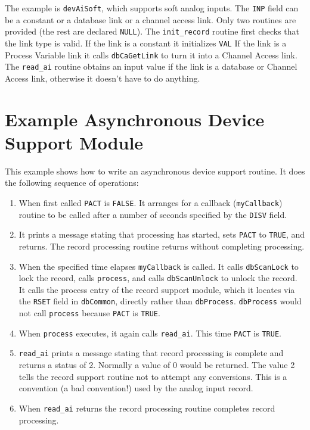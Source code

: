 The example is \verb|devAiSoft|, which supports soft analog inputs. The \verb|INP| field can be a constant or a database link or a 
channel access link. Only two routines are provided (the rest are declared \verb|NULL|). The \verb|init_record| routine first checks 
that the link type is valid. If the link is a constant it initializes \verb|VAL| If the link is a Process Variable link it calls 
\verb|dbCaGetLink| to turn it into a Channel Access link. The \verb|read_ai| routine obtains an input value if the link is a database 
or Channel Access link, otherwise it doesn't have to do anything.  

\section{Example Asynchronous Device Support Module}

This example shows how to write an asynchronous device support routine. It does the following sequence of operations:

\begin{enumerate}
\item When first called \verb|PACT| is \verb|FALSE|. It arranges for a callback (\verb|myCallback|) routine to be called after a number of 
seconds specified by the \verb|DISV| field.

\item It prints a message stating that processing has started, sets \verb|PACT| to \verb|TRUE|, and returns. The record processing routine 
returns without completing processing.

\item When the specified time elapses \verb|myCallback| is called. It calls \verb|dbScanLock| to lock the record, calls \verb|process|, 
and calls \verb|dbScanUnlock| to unlock the record. It calls the process entry of the record support module, which it 
locates via the \verb|RSET| field in \verb|dbCommon|, directly rather than \verb|dbProcess|. \verb|dbProcess| would not call \verb|process| 
because \verb|PACT| is \verb|TRUE|. 

\item When \verb|process| executes, it again calls \verb|read_ai|. This time \verb|PACT| is \verb|TRUE|.

\item \verb|read_ai| prints a message stating that record processing is complete and returns a status of 2. Normally a value of  
0 would be returned. The value 2 tells the record support routine not to attempt any conversions. This is a 
convention (a bad convention!) used by the analog input record.

\item When \verb|read_ai| returns the record processing routine completes record processing.

\end{enumerate}

